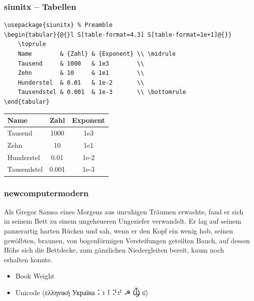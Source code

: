 \documentclass[aspectratio=169, 10pt]{beamer}
\begin{document}
\begin{frame}[fragile]
    \frametitle{siunitx -- Tabellen}
    \begin{lstlisting}[basicstyle=\ttfamily\footnotesize]
\usepackage{siunitx} % Preamble
\begin{tabular}{@{}l S[table-format=4.3] S[table-format=1e+1]@{}}
    \toprule
    Name        & {Zahl} & {Exponent} \\ \midrule
    Tausend     & 1000   & 1e3        \\
    Zehn        & 10     & 1e1        \\
    Hunderstel  & 0.01   & 1e-2       \\
    Tausendstel & 0.001  & 1e-3       \\ \bottomrule
\end{tabular}
    \end{lstlisting}
    \vspace*{-1ex}
    \begin{center}
        \begin{tabular}{@{}l S[table-format=4.3] S[table-format=1e+1]@{}}
            \toprule
            Name        & {Zahl} & {Exponent} \\ \midrule
            Tausend     & 1000   & 1e3        \\
            Zehn        & 10     & 1e1        \\
            Hunderstel  & 0.01   & 1e-2       \\
            Tausendstel & 0.001  & 1e-3       \\ \bottomrule
        \end{tabular}
    \end{center}
\end{frame}

\begin{frame}[fragile]
    \frametitle{newcomputermodern}
    \begin{multicols}{2}
        \small{}

        Als Gregor Samsa eines Morgens aus unruhigen Träumen erwachte, fand er sich in seinem Bett zu einem ungeheueren Ungeziefer verwandelt.
        Er lag auf seinem panzerartig harten Rücken und sah, wenn er den Kopf ein wenig hob, seinen gewölbten, braunen, von bogenförmigen Versteifungen geteilten Bauch, auf dessen Höhe sich die Bettdecke, zum gänzlichen Niedergleiten bereit, kaum noch erhalten konnte.
    \end{multicols}
    \begin{itemize}
        \item Book Weight
        \item Unicode (ελληνική Україна ⠅⠆⠇⠝⠞  ☭ Ⳃ ʛ)
    \end{itemize}
\end{frame}
\end{document}
